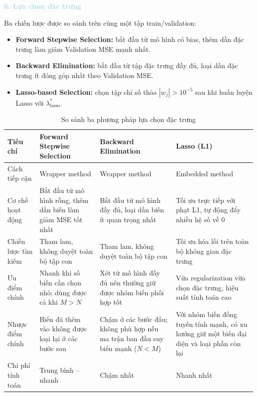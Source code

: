 \noindent\textcolor{lightblue}{\textbf{6. Lựa chọn đặc trưng}}

Ba chiến lược được so sánh trên cùng một tập train/validation:
\begin{itemize} [labelsep=10pt, leftmargin=2cm]
    \item \textbf{Forward Stepwise Selection:} bắt đầu từ mô hình có bias, thêm dần đặc trưng làm giảm Validation MSE mạnh nhất.
    \item \textbf{Backward Elimination:} bắt đầu từ tập đặc trưng đầy đủ, loại dần đặc trưng ít đóng góp nhất theo Validation MSE.
    \item \textbf{Lasso-based Selection:} chọn tập chỉ số thỏa $|w_j|>10^{-5}$ sau khi huấn luyện Lasso với $\lambda^{\ast}_{\text{lasso}}$.
\end{itemize}

\begin{table}[H]
    \centering
    \caption{So sánh ba phương pháp lựa chọn đặc trưng}
    \label{tab:feature_selection_method_comparison}
    \renewcommand{\arraystretch}{1.25}
    \begin{tabular}{|p{3.0cm}|p{4.0cm}|p{4.0cm}|p{4.0cm}|}
        \hline
        \textbf{Tiêu chí} & \textbf{Forward Stepwise Selection} & \textbf{Backward Elimination} & \textbf{Lasso (L1)} \\ \hline
        Cách tiếp cận & Wrapper method & Wrapper method & Embedded method \\ \hline
        Cơ chế hoạt động & Bắt đầu từ mô hình rỗng, thêm dần biến làm giảm MSE tốt nhất & Bắt đầu từ mô hình đầy đủ, loại dần biến ít quan trọng nhất & Tối ưu trực tiếp với phạt L1, tự động đẩy nhiều hệ số về 0 \\ \hline
        Chiến lược tìm kiếm & Tham lam, không duyệt toàn bộ tập con & Tham lam, không duyệt toàn bộ tập con & Tối ưu hóa lồi trên toàn bộ không gian đặc trưng \\ \hline
        Ưu điểm chính & Nhanh khi số biến cần chọn nhỏ; dùng được cả khi $M>N$ & Xét từ mô hình đầy đủ nên thường giữ được nhóm biến phối hợp tốt & Vừa regularization vừa chọn đặc trưng, hiệu suất tính toán cao \\ \hline
        Nhược điểm chính & Biến đã thêm vào không được loại lại ở các bước sau & Chậm ở các bước đầu; không phù hợp nếu ma trận ban đầu suy biến mạnh ($N<M$) & Với nhóm biến đồng tuyến tính mạnh, có xu hướng giữ một biến đại diện và loại phần còn lại \\ \hline
        Chi phí tính toán & Trung bình -- nhanh & Chậm nhất & Nhanh nhất \\ \hline
    \end{tabular}
\end{table}

